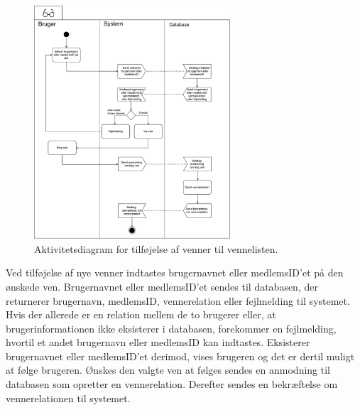 \begin{figure} [H]
\centering
\includegraphics[width=0.65\textwidth]{figures/aktivitetsdiagram/foelgnyven}
\caption{Aktivitetsdiagram for tilføjelse af venner til vennelisten.}
\label{fig:tilfoejven}
\end{figure}

Ved tilføjelse af nye venner indtastes brugernavnet eller medlemsID'et på den ønskede ven. Brugernavnet eller medlemsID'et sendes til databasen, der returnerer brugernavn, medlemsID, vennerelation eller fejlmelding til systemet. Hvis der allerede er en relation mellem de to brugerer eller, at brugerinformationen ikke eksisterer i databasen, forekommer en fejlmelding, hvortil et andet brugernavn eller medlemsID kan indtastes. Eksisterer brugernavnet eller medlemsID'et derimod, vises brugeren og det er dertil muligt at følge brugeren. Ønskes den valgte ven at følges sendes en anmodning til databasen som opretter en vennerelation. Derefter sendes en bekræftelse om vennerelationen til systemet.